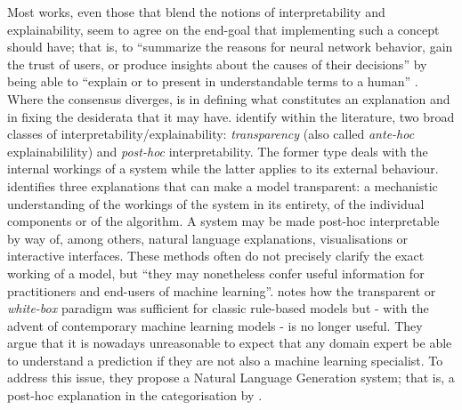 Most works, even those that blend the notions of interpretability and explainability, seem to agree on the end-goal that implementing such a concept should have; that is, to \enquote{summarize the reasons for neural network behavior, gain the trust of users, or produce insights about the causes of their decisions} \citep{gilpin2018explaining} by being able to \enquote{explain or to present in understandable terms to a human} \citep{doshi2017towards}.
Where the consensus diverges, is in defining what constitutes an explanation and in fixing the desiderata that it may have.
\citet{mittelstadt2019explaining} identify within the literature, two broad classes of interpretability/explainability: \textit{transparency} (also called \textit{ante-hoc} explainabilility) and \textit{post-hoc} interpretability.
The former type deals with the internal workings of a system while the latter applies to its external behaviour.
\citet{Lipton2016} identifies three explanations that can make a model transparent: a mechanistic understanding of the workings of the system in its entirety, of the individual components or of the algorithm.
A system may be made post-hoc interpretable by way of, among others, natural language explanations, visualisations or interactive interfaces.
These methods often do not precisely clarify the exact working of a model, but \enquote{they may nonetheless confer useful information for practitioners and end-users of machine learning}.
\citet{Biran2017} notes how the transparent or \textit{white-box} paradigm was sufficient for classic rule-based models but - with the advent of contemporary machine learning models - is no longer useful.
They argue that it is nowadays unreasonable to expect that any domain expert be able to understand a prediction if they are not also a machine learning specialist.
To address this issue, they propose a Natural Language Generation system; that is, a post-hoc explanation in the categorisation by \citet{mittelstadt2019explaining}.

